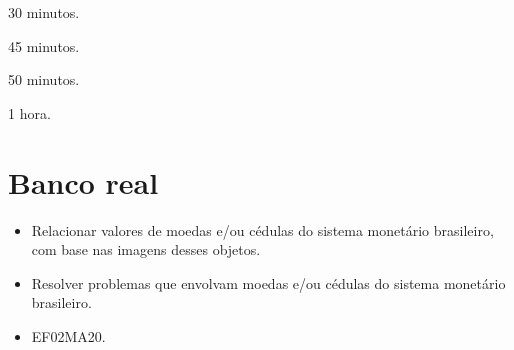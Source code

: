\begin{minipage}{.5\textwidth}
\begin{escolha}
\item 30 minutos.

\item 45 minutos.

\item 50 minutos.

\item 1 hora.
\end{escolha}
\end{minipage}

\chapter{Banco real}



\begin{itemize}
\item Relacionar valores de moedas e/ou cédulas do sistema monetário
brasileiro, com base nas imagens desses objetos.

\item Resolver problemas que envolvam moedas e/ou cédulas do sistema
monetário brasileiro.
\end{itemize}


\begin{itemize}
\item EF02MA20.
\end{itemize}

